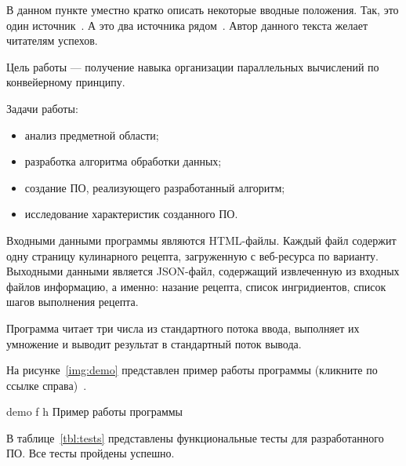 

В данном пункте уместно кратко описать некоторые вводные положения. Так, это один источник~\cite{etap_3}. 
А это два источника рядом~\cite{nlp_bolshakova_vorontsov, ronzhin_iface}. Автор данного текста желает 
читателям успехов.

Цель работы --- получение навыка организации параллельных вычислений по конвейерному принципу. 

Задачи работы: 
\begin{itemize}
    \item анализ предметной области;
    \item разработка алгоритма обработки данных;
    \item создание ПО, реализующего разработанный алгоритм;
    \item исследование характеристик созданного ПО.
\end{itemize}


Входными данными программы являются HTML-файлы. Каждый файл содержит одну страницу кулинарного рецепта, загруженную с 
веб-ресурса по варианту. Выходными данными является JSON-файл, содержащий извлеченную из входных файлов информацию, а именно: 
назание рецепта, список ингридиентов, список шагов выполнения рецепта. 

 
Программа читает три числа из стандартного потока ввода, выполняет их умножение и выводит результат в стандартный поток вывода. 


На рисунке~\ref{img:demo} представлен пример работы программы (кликните по ссылке справа)~\cite{pizza_mishka}.

\FloatBarrier
{}
{demo} %
{f} %
{h} %
{\textwidth} %
{Пример работы программы} %
\FloatBarrier



В таблице~\ref{tbl:tests} представлены функциональные тесты для разработанного ПО. Все тесты пройдены успешно.

